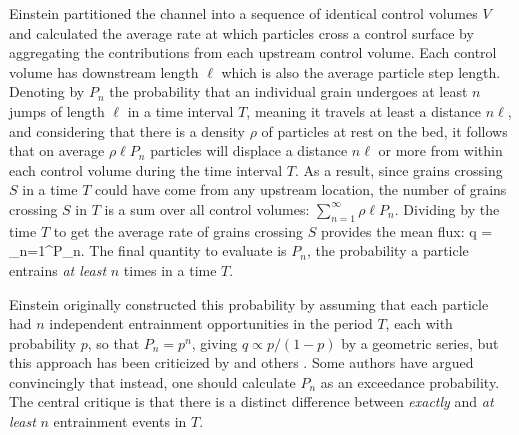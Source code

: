 Einstein partitioned the channel into a sequence of identical control volumes \DIFaddbegin \DIFadd{(}\DIFaddend $V$\DIFdelbegin \DIFdel{, }\DIFdelend \DIFaddbegin \DIFadd{) }\DIFaddend and calculated the average rate at which particles cross a control surface \DIFaddbegin {}\DIFaddend by aggregating the contributions from each upstream control volume.
Each control volume has downstream length $\ell$ which is also the average particle step length.
Denoting by $P_n$ the probability that an individual grain undergoes at least $n$ jumps of length $\ell$ in a time interval $T$, meaning it travels at least a distance $n \ell$, and considering that there is a density $\rho$ of particles at rest on the bed, it follows that on average $\rho \ell P_n$ particles will displace a distance $n \ell$ or more from within each control volume during the time interval $T$. 
As a result, since grains crossing $S$ in a time $T$ could have come from any upstream location, the number of grains crossing $S$ in $T$ is a sum over all control volumes: $\sum_{n=1}^\infty \rho \ell P_n$.
Dividing by the time $T$ to get the average rate of grains crossing $S$ provides the mean flux:
\be q =  \sum_{n=1}^\infty P_n. \label{eq:einflux} \ee
The final quantity to evaluate is $P_n$, the probability a particle entrains \textit{at least} $n$ times in a time $T$.

Einstein originally constructed this probability by assuming that each particle had $n$ independent entrainment opportunities in the period $T$, each with probability $p$, so that $P_n = p^n$, giving $q \propto p/(1-p)$ by a geometric series, but this approach has been criticized by \citet{Yalin1972} and others \citep{Paintal1971,Cheng2004,Armanini2015,Armanini2017}. Some authors have argued convincingly that instead, one should calculate $P_n$ as an exceedance probability.
The central critique is that there is a distinct difference between \textit{exactly} and \textit{at least} $n$ entrainment events in $T$.

